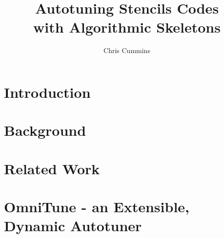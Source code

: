 

\def\draft{}
\def\version{2015-08-14}



\title{Autotuning Stencils Codes\\with Algorithmic Skeletons}

\author{Chris Cummins}



\abstract{}



  


  \chapter{Introduction}\label{chap:introduction}
  


  \chapter{Background}\label{chap:background}
  

  \chapter{Related Work}\label{chap:related}
  

  \chapter{OmniTune - an Extensible, Dynamic Autotuner}\label{chap:autotune}
  


